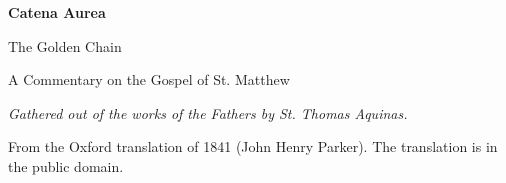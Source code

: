 \documentclass[11pt,letterpaper]{article}
\begin{document}
\color{ink}

\begin{titlepage}
\centering
\vspace*{4em}
{\LARGE\bfseries\color{heading} Catena Aurea\par}
\vspace{1em}
{\large The Golden Chain\par}
\vspace{2em}
{\Large\color{subhead} A Commentary on the Gospel of St. Matthew\par}
\vspace{2.5em}
{\itshape\color{subhead} Gathered out of the works of the Fathers by
St. Thomas Aquinas.\par}
\vfill
{\small From the Oxford translation of 1841 (John Henry Parker). The
translation is in the public domain.\par}
\vspace{2em}
\end{titlepage}

\tableofcontents


\end{document}
